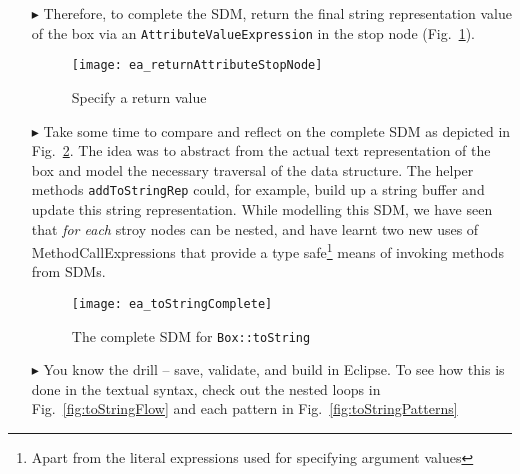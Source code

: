 \begin{itemize}

\item[$\blacktriangleright$] Therefore, to complete the SDM, return the final string representation value of the box via an \texttt{AttributeValueExpression} in
the stop node (Fig.~\ref{fig:toStringStopNode}).

\begin{figure}[htbp]
\begin{center}
  \texttt{[image: ea\_returnAttributeStopNode]}
  \caption{Specify a return value}
  \label{fig:toStringStopNode}
\end{center}
\end{figure}

\item[$\blacktriangleright$] Take some time to compare and reflect on the complete SDM as depicted in Fig.~\ref{fig:sdm_tostring_5}.  The idea was to abstract
from the actual text representation of the box and model the necessary traversal of the data structure. The helper methods \texttt{addToStringRep} could, for example, build up a
string buffer and update this string representation. While modelling this SDM, we have seen that \emph{for each} stroy nodes can be nested, and have learnt two
new uses of MethodCallExpressions that provide a type safe\footnote{Apart from the literal expressions used for specifying argument values} means of invoking
methods from SDMs.

\begin{figure}[htbp]
\begin{center}
  \texttt{[image: ea\_toStringComplete]}
  \caption{The complete SDM for \texttt{Box::toString}}  
  \label{fig:sdm_tostring_5}
\end{center}
\end{figure}
\FloatBarrier

\item[$\blacktriangleright$] You know the drill -- save, validate, and build in Eclipse. To see how this is done in the textual syntax, check out the nested
loops in Fig.~\ref{fig:toStringFlow} and each pattern in Fig.~\ref{fig:toStringPatterns}


\end{itemize}
